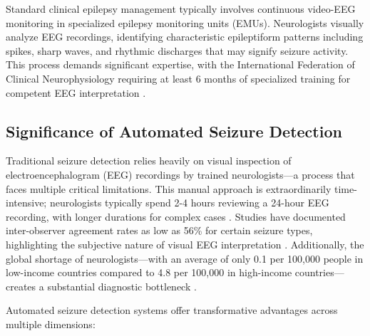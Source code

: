 \documentclass[pdflatex,sn-mathphys-num]{sn-jnl}%
\theoremstyle{thmstyleone}%
\theoremstyle{thmstyletwo}%
\theoremstyle{thmstylethree}%
\begin{document}
Standard clinical epilepsy management typically involves continuous video-EEG monitoring in specialized epilepsy monitoring units (EMUs). Neurologists visually analyze EEG recordings, identifying characteristic epileptiform patterns including spikes, sharp waves, and rhythmic discharges that may signify seizure activity. This process demands significant expertise, with the International Federation of Clinical Neurophysiology requiring at least 6 months of specialized training for competent EEG interpretation \citep{Seeck2017}.

\subsection{Significance of Automated Seizure Detection}

Traditional seizure detection relies heavily on visual inspection of electroencephalogram (EEG) recordings by trained neurologists—a process that faces multiple critical limitations. This manual approach is extraordinarily time-intensive; neurologists typically spend 2-4 hours reviewing a 24-hour EEG recording, with longer durations for complex cases \citep{Beniczky2020}. Studies have documented inter-observer agreement rates as low as 56\% for certain seizure types, highlighting the subjective nature of visual EEG interpretation \citep{Halford2015}. Additionally, the global shortage of neurologists—with an average of only 0.1 per 100,000 people in low-income countries compared to 4.8 per 100,000 in high-income countries—creates a substantial diagnostic bottleneck \citep{WFN2021}.

Automated seizure detection systems offer transformative advantages across multiple dimensions:
\end{document}
